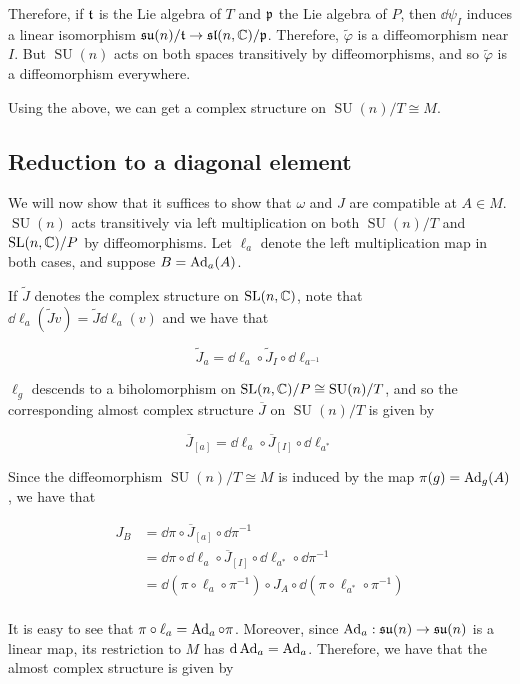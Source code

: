 \documentclass{article}
\DeclareMathOperator{\SU}{SU}
\newcommand{\su}{\mathfrak{su}}
\renewcommand{\sl}{\mathfrak{sl}}
\renewcommand{\tilde}{\widetilde}
\begin{document}
Therefore, if \(\mathfrak{t}\) is the Lie algebra of \(T\) and \(\mathfrak{p}\) the Lie algebra of \(P\), then \(\dd\psi_I\) induces a linear isomorphism \(\su(n)/\mft \to \sl(n, \C)/\mfp\). Therefore, \(\tilde\varphi\) is a diffeomorphism near \(I\). But \(\SU(n)\) acts on both spaces transitively by diffeomorphisms, and so \(\tilde\varphi\) is a diffeomorphism everywhere.

Using the above, we can get a complex structure on \(\SU(n)/T \cong M\).

\subsection{Reduction to a diagonal element}

We will now show that it suffices to show that \(\omega\) and \(J\) are compatible at \(A \in M\). \(\SU(n)\) acts transitively via left multiplication on both \(\SU(n)/T\) and \(\operatorname{SL}(n, \mathbb{C})/P\) by diffeomorphisms. Let \(\ell_a\) denote the left multiplication map in both cases, and suppose \(B = \operatorname{Ad}_a(A)\).

If \(\tilde J\) denotes the complex structure on \(\operatorname{SL}(n, \mathbb{C})\), note that \(\dd \ell_a(\tilde Jv) = \tilde J\dd\ell_a(v)\) and we have that

\[\tilde J_a = \dd \ell_a \circ \tilde J_I \circ \dd\ell_{a^{-1}}\]

\(\ell_g\) descends to a biholomorphism on \(\SL(n, \C)/P \cong \SU(n)/T\), and so the corresponding almost complex structure \(\overline J\) on \(\SU(n)/T\) is given by

\begin{equation}
    \label{eq:cx-str-quot}
    \overline J_{[a]} = \dd\ell_a \circ \overline J_{[I]} \circ \dd\ell_{a^*}
\end{equation}

Since the diffeomorphism \(\SU(n)/T \cong M\) is induced by the map \(\pi(g) = \operatorname{Ad}_g(A)\), we have that

\begin{align*}
    J_B &= \dd\pi \circ \overline J_{[a]} \circ \dd\pi^{-1} \\
    &= \dd\pi \circ \dd \ell_a \circ \overline J_{[I]} \circ \dd \ell_{a^*} \circ \dd \pi^{-1} \\
    &= \dd(\pi \circ \ell_a \circ \pi^{-1}) \circ J_A \circ \dd(\pi \circ \ell_{a^*} \circ \pi^{-1}) \\
\end{align*}

It is easy to see that \(\pi \circ \ell_a = \operatorname{Ad}_a \circ \pi\). Moreover, since \(\Ad_a : \su(n) \to \su(n)\) is a linear map, its restriction to \(M\) has \(\dd \operatorname{Ad}_a = \operatorname{Ad}_a\). Therefore, we have that the almost complex structure is given by
\end{document}
